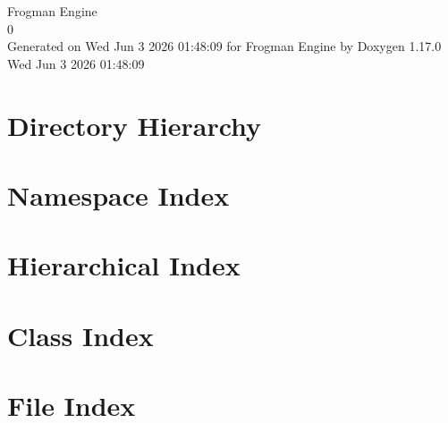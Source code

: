 \documentclass[twoside]{book}
\newcommand{\+}{\discretionary{\mbox{\scriptsize$\hookleftarrow$}}{}{}}
\newcommand{\clearemptydoublepage}{%
    \newpage{\pagestyle{empty}\cleardoublepage}%
  }
\begin{document}
  \raggedbottom
    \hypersetup{pageanchor=false,
                bookmarksnumbered=true,
                pdfencoding=unicode
               }
  \begin{titlepage}
  \vspace*{7cm}
  \begin{center}%
  {\Large Frogman Engine}\\
  [1ex]\large 0 \\
  \vspace*{1cm}
  {\large Generated on Wed Jun 3 2026 01:\+48:\+09 for Frogman Engine by Doxygen 1.17.0}\\
    \vspace*{0.5cm}
    {\small Wed Jun 3 2026 01:48:09}
  \end{center}
  \end{titlepage}
  \clearemptydoublepage
  \tableofcontents
  \clearemptydoublepage
  \hypersetup{pageanchor=true}
\chapter{Directory Hierarchy}

\chapter{Namespace Index}

\chapter{Hierarchical Index}

\chapter{Class Index}

\chapter{File Index}

\end{document}
